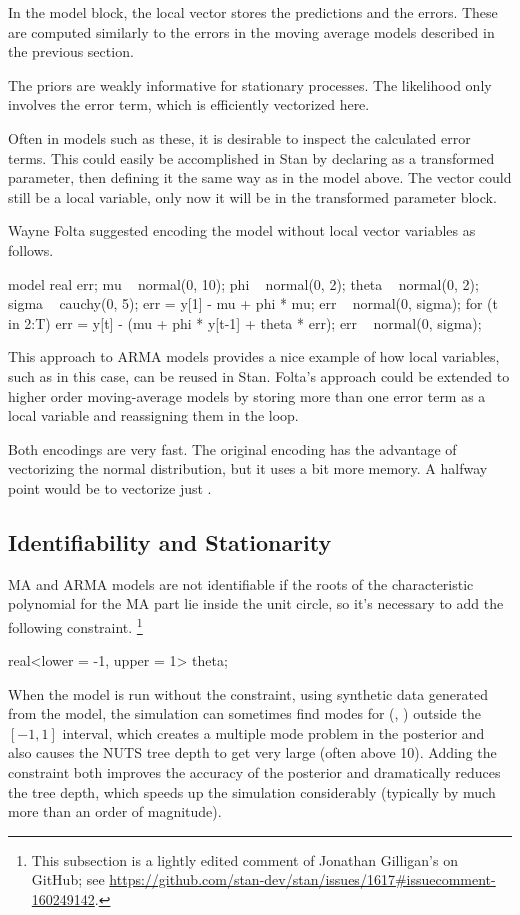 In the model block, the local vector  stores the predictions
and  the errors.  These are computed similarly to the
errors in the moving average models described in the previous section.  

The priors are weakly informative for stationary processes.  The
likelihood only involves the error term, which is efficiently
vectorized here.

Often in models such as these, it is desirable to inspect the
calculated error terms.  This could easily be accomplished in Stan by
declaring  as a transformed parameter, then defining it the
same way as in the model above.  The vector  could still be a
local variable, only now it will be in the transformed parameter block.

Wayne Folta suggested encoding the model without local vector
variables as follows.
%
\begin{stancode}
model {
  real err;
  mu ~ normal(0, 10);
  phi ~ normal(0, 2);
  theta ~ normal(0, 2);
  sigma ~ cauchy(0, 5);
  err = y[1] - mu + phi * mu;
  err ~ normal(0, sigma);
  for (t in 2:T) {
    err = y[t] - (mu + phi * y[t-1] + theta * err); 
    err ~ normal(0, sigma);
  }
}
\end{stancode}
%
This approach to ARMA models provides a nice example of how local
variables, such as  in this case, can be reused in Stan.
Folta's approach could be extended to higher order moving-average
models by storing more than one error term as a local variable and
reassigning them in the loop.  

Both encodings are very fast.  The original encoding has the advantage
of vectorizing the normal distribution, but it uses a bit more memory.
A halfway point would be to vectorize just .

\subsection{Identifiability and Stationarity}%

MA and ARMA models are not identifiable if the roots of the
characteristic polynomial for the MA part lie inside the unit circle,
so it's necessary to add the following constraint.%
%
\footnote{This subsection is a lightly edited comment of Jonathan
  Gilligan's on GitHub; see
  \url{https://github.com/stan-dev/stan/issues/1617\#issuecomment-160249142}.}
%
\begin{stancode}
real<lower = -1, upper = 1> theta;
\end{stancode}
%
When the model is run without the constraint, using synthetic data
generated from the model, the simulation can sometimes find modes for
(, ) outside the $[-1,1]$ interval, which
creates a multiple mode problem in the posterior and also causes the
NUTS tree depth to get very large (often above 10). Adding the
constraint both improves the accuracy of the posterior and
dramatically reduces the tree depth, which speeds up the simulation
considerably (typically by much more than an order of magnitude).

